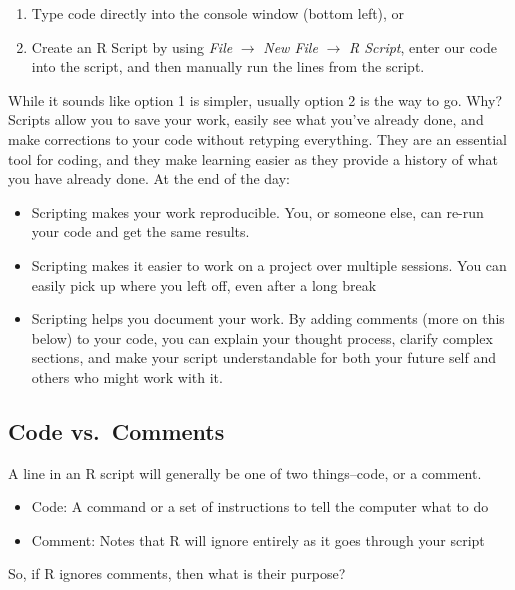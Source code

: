 \documentclass[
  letterpaper,
]{book}
\providecommand{\tightlist}{%
  \setlength{\itemsep}{0pt}\setlength{\parskip}{0pt}}\usepackage{longtable,booktabs,array}
\begin{document}
\begin{enumerate}
\def\labelenumi{\arabic{enumi}.}
\tightlist
\item
  Type code directly into the console window (bottom left), or
\item
  Create an R Script by using \emph{File} \(\rightarrow\) \emph{New
  File} \(\rightarrow\) \emph{R Script}, enter our code into the script,
  and then manually run the lines from the script.
\end{enumerate}

While it sounds like option 1 is simpler, usually option 2 is the way to
go. Why? Scripts allow you to save your work, easily see what you've
already done, and make corrections to your code without retyping
everything. They are an essential tool for coding, and they make
learning easier as they provide a history of what you have already done.
At the end of the day:

\begin{itemize}
\tightlist
\item
  Scripting makes your work reproducible. You, or someone else, can
  re-run your code and get the same results.
\item
  Scripting makes it easier to work on a project over multiple sessions.
  You can easily pick up where you left off, even after a long break
\item
  Scripting helps you document your work. By adding comments (more on
  this below) to your code, you can explain your thought process,
  clarify complex sections, and make your script understandable for both
  your future self and others who might work with it.
\end{itemize}

\subsection{Code vs.~Comments}\label{code-vs.-comments}

A line in an R script will generally be one of two things--code, or a
comment.

\begin{itemize}
\tightlist
\item
  Code: A command or a set of instructions to tell the computer what to
  do
\item
  Comment: Notes that R will ignore entirely as it goes through your
  script
\end{itemize}

So, if R ignores comments, then what is their purpose?
\end{document}

